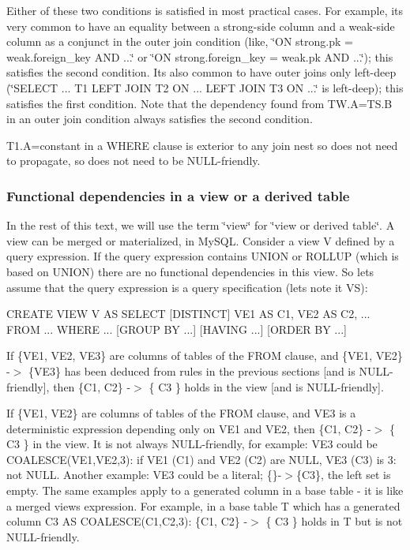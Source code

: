 Either of these two conditions is satisfied in most practical cases. For example, it\textquotesingle{}s very common to have an equality between a strong-\/side column and a weak-\/side column as a conjunct in the outer join condition (like, \char`\"{}\+O\+N
strong.\+pk = weak.\+foreign\+\_\+key A\+N\+D ...\char`\"{} or \char`\"{}\+O\+N strong.\+foreign\+\_\+key = weak.\+pk A\+N\+D
...\char`\"{}); this satisfies the second condition. It\textquotesingle{}s also common to have outer joins only left-\/deep (\char`\"{}\+S\+E\+L\+E\+C\+T ... T1 L\+E\+F\+T J\+O\+I\+N T2 O\+N ... L\+E\+F\+T J\+O\+I\+N T3 O\+N ...\char`\"{} is left-\/deep); this satisfies the first condition. Note that the dependency found from T\+W.\+A=T\+S.\+B in an outer join condition always satisfies the second condition.

T1.\+A=constant in a W\+H\+E\+RE clause is exterior to any join nest so does not need to propagate, so does not need to be N\+U\+LL-\/friendly.\hypertarget{group__AGGREGATE__CHECKS_FDVIEW}{}\subsubsection{Functional dependencies in a view or a derived table}\label{group__AGGREGATE__CHECKS_FDVIEW}
In the rest of this text, we will use the term \char`\"{}view\char`\"{} for \char`\"{}view or derived
table\char`\"{}. A view can be merged or materialized, in My\+S\+QL. Consider a view V defined by a query expression. If the query expression contains U\+N\+I\+ON or R\+O\+L\+L\+UP (which is based on U\+N\+I\+ON) there are no functional dependencies in this view. So let\textquotesingle{}s assume that the query expression is a query specification (let\textquotesingle{}s note it VS)\+: \begin{DoxyVerb}CREATE VIEW V AS SELECT [DISTINCT] VE1 AS C1, VE2 AS C2, ... FROM ... WHERE ... [GROUP BY ...] [HAVING ...] [ORDER BY ...]
\end{DoxyVerb}


If \{V\+E1, V\+E2, V\+E3\} are columns of tables of the F\+R\+OM clause, and \{V\+E1, V\+E2\} -\/$>$ \{V\+E3\} has been deduced from rules in the previous sections \mbox{[}and is N\+U\+LL-\/friendly\mbox{]}, then \{C1, C2\} -\/$>$ \{ C3 \} holds in the view \mbox{[}and is N\+U\+LL-\/friendly\mbox{]}.

If \{V\+E1, V\+E2\} are columns of tables of the F\+R\+OM clause, and V\+E3 is a deterministic expression depending only on V\+E1 and V\+E2, then \{C1, C2\} -\/$>$ \{ C3 \} in the view. It is not always N\+U\+LL-\/friendly, for example\+: V\+E3 could be C\+O\+A\+L\+E\+S\+C\+E(\+V\+E1,\+V\+E2,3)\+: if V\+E1 (C1) and V\+E2 (C2) are N\+U\+LL, V\+E3 (C3) is 3\+: not N\+U\+LL. Another example\+: V\+E3 could be a literal; \{\}-\/$>$\{C3\}, the left set is empty. The same examples apply to a generated column in a base table -\/ it is like a merged view\textquotesingle{}s expression. For example, in a base table T which has a generated column C3 AS C\+O\+A\+L\+E\+S\+C\+E(\+C1,\+C2,3)\+: \{C1, C2\} -\/$>$ \{ C3 \} holds in T but is not N\+U\+LL-\/friendly.

